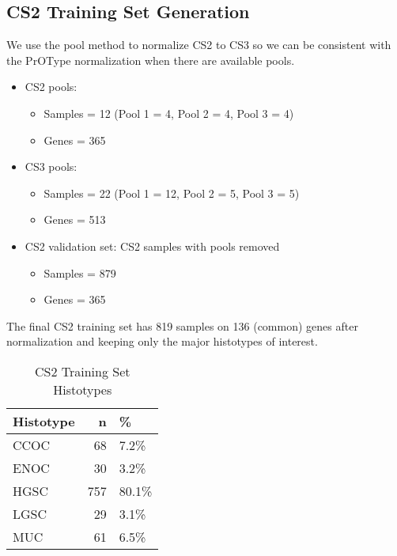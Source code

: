 \documentclass[
]{report}
\providecommand{\tightlist}{%
  \setlength{\itemsep}{0pt}\setlength{\parskip}{0pt}}
\begin{document}
\hypertarget{cs2-training-set-generation}{%
\subsection{CS2 Training Set Generation}\label{cs2-training-set-generation}}

We use the pool method to normalize CS2 to CS3 so we can be consistent with the PrOType normalization when there are available pools.

\begin{itemize}
\item
  CS2 pools:

  \begin{itemize}
  \tightlist
  \item
    Samples = 12 (Pool 1 = 4, Pool 2 = 4, Pool 3 = 4)
  \item
    Genes = 365
  \end{itemize}
\item
  CS3 pools:

  \begin{itemize}
  \tightlist
  \item
    Samples = 22 (Pool 1 = 12, Pool 2 = 5, Pool 3 = 5)
  \item
    Genes = 513
  \end{itemize}
\item
  CS2 validation set: CS2 samples with pools removed

  \begin{itemize}
  \tightlist
  \item
    Samples = 879
  \item
    Genes = 365
  \end{itemize}
\end{itemize}

The final CS2 training set has 819 samples on 136 (common) genes after normalization and keeping only the major histotypes of interest.

\begin{table}

\caption{\label{tab:training-dist-cs2}CS2 Training Set Histotypes}
\centering
\begin{tabular}[t]{l|r|l}
\hline
Histotype & n & \%\\
\hline
CCOC & 68 & 7.2\%\\
\hline
ENOC & 30 & 3.2\%\\
\hline
HGSC & 757 & 80.1\%\\
\hline
LGSC & 29 & 3.1\%\\
\hline
MUC & 61 & 6.5\%\\
\hline
\end{tabular}
\end{table}
\end{document}
